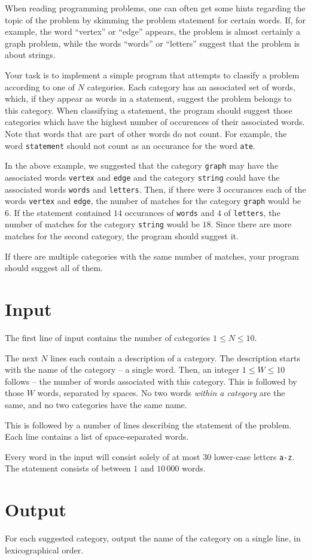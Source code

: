 When reading programming problems, one can often get some hints regarding the topic of the problem by skimming the problem statement for certain words.
If, for example, the word ``vertex'' or ``edge'' appears, the problem is almost certainly a graph problem, while the words ``words'' or ``letters'' suggest that the problem is about strings.

Your task is to implement a simple program that attempts to classify a problem according to one of $N$ categories.
Each category has an associated set of words, which, if they appear as words in a statement, suggest the problem belongs to this category.
When classifying a statement, the program should suggest those categories which have the highest number of occurences of their associated words.
Note that words that are part of other words do not count.
For example, the word \texttt{statement} should not count as an occurance for the word \texttt{ate}.

In the above example, we suggested that the category \texttt{graph} may have the associated words \texttt{vertex} and \texttt{edge} and the category \texttt{string} could have the associated words \texttt{words} and \texttt{letters}.
Then, if there were $3$ occurances each of the words \texttt{vertex} and \texttt{edge}, the number of matches for the category \texttt{graph} would be $6$.
If the statement contained $14$ occurances of \texttt{words} and $4$ of \texttt{letters}, the number of matches for the category \texttt{string} would be $18$.
Since there are more matches for the second category, the program should suggest it.

If there are multiple categories with the same number of matches, your program should suggest all of them.

\section*{Input}
The first line of input contains the number of categories $1 \le N \le 10$.

The next $N$ lines each contain a description of a category.
The description starts with the name of the category -- a single word.
Then, an integer $1 \le W \le 10$ follows -- the number of words associated with this category.
This is followed by those $W$ words, separated by spaces.
No two words \emph{within a category} are the same, and no two categories have the same name.

This is followed by a number of lines describing the statement of the problem.
Each line contains a list of space-separated words.

Every word in the input will consist solely of at most $30$ lower-case letters \texttt{a-z}.
The statement consists of between $1$ and $10\,000$ words.

\section*{Output}
For each suggested category, output the name of the category on a single line, in lexicographical order.
